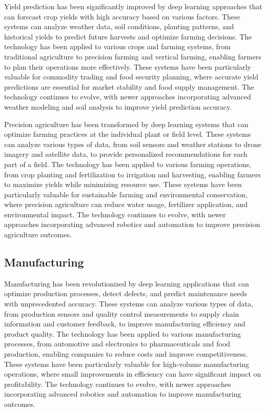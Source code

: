 Yield prediction has been significantly improved by deep learning approaches that can forecast crop yields with high accuracy based on various factors. These systems can analyze weather data, soil conditions, planting patterns, and historical yields to predict future harvests and optimize farming decisions. The technology has been applied to various crops and farming systems, from traditional agriculture to precision farming and vertical farming, enabling farmers to plan their operations more effectively. These systems have been particularly valuable for commodity trading and food security planning, where accurate yield predictions are essential for market stability and food supply management. The technology continues to evolve, with newer approaches incorporating advanced weather modeling and soil analysis to improve yield prediction accuracy.

Precision agriculture has been transformed by deep learning systems that can optimize farming practices at the individual plant or field level. These systems can analyze various types of data, from soil sensors and weather stations to drone imagery and satellite data, to provide personalized recommendations for each part of a field. The technology has been applied to various farming operations, from crop planting and fertilization to irrigation and harvesting, enabling farmers to maximize yields while minimizing resource use. These systems have been particularly valuable for sustainable farming and environmental conservation, where precision agriculture can reduce water usage, fertilizer application, and environmental impact. The technology continues to evolve, with newer approaches incorporating advanced robotics and automation to improve precision agriculture outcomes.

\subsection{Manufacturing}

Manufacturing has been revolutionized by deep learning applications that can optimize production processes, detect defects, and predict maintenance needs with unprecedented accuracy. These systems can analyze various types of data, from production sensors and quality control measurements to supply chain information and customer feedback, to improve manufacturing efficiency and product quality. The technology has been applied to various manufacturing processes, from automotive and electronics to pharmaceuticals and food production, enabling companies to reduce costs and improve competitiveness. These systems have been particularly valuable for high-volume manufacturing operations, where small improvements in efficiency can have significant impact on profitability. The technology continues to evolve, with newer approaches incorporating advanced robotics and automation to improve manufacturing outcomes.

